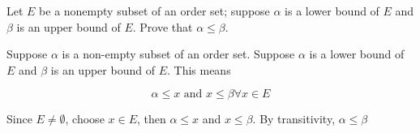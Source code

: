 Let $E$ be a nonempty subset of an order set; suppose $\alpha$ is a lower bound of $E$ and $\beta$ is an upper bound of $E$. Prove that $\alpha \leq \beta$.

\begin{tcolorbox}
	\begin{solution}
		Suppose $\alpha$ is a non-empty subset of an order set. Suppose $\alpha$ is a lower bound of $E$ and $\beta$ is an upper bound of $E$. This means
		
		$$\alpha \leq x \text{ and } x \leq \beta \forall x \in E$$
		
		Since $E \neq \emptyset$, choose $x \in E$, then $\alpha \leq x$ and $x \leq \beta$. By transitivity, $\alpha \leq \beta$
	\end{solution}
\end{tcolorbox}